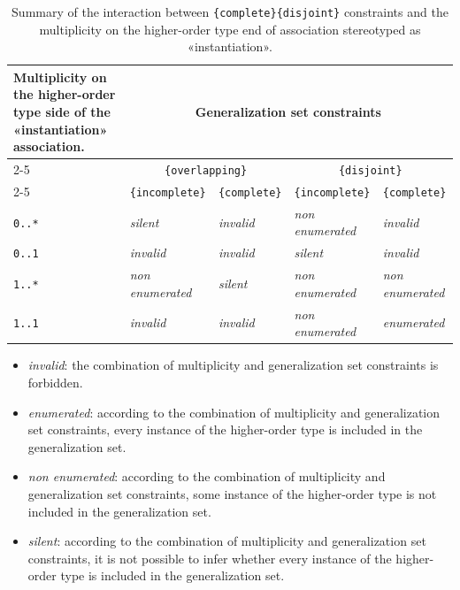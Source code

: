 \begin{table}[hbt]
\caption{Summary of the interaction between \texttt{\{complete\}}\/\texttt{\{disjoint\}} constraints and the multiplicity on the higher-order type end of association stereotyped as «instantiation».}
\label{tab:mlt-generalization-set-contraints}
\begin{tabularx}{\linewidth}{|X|l|l|l|l|}
\hline
\multirow{3}{*}{%
  \parbox{\linewidth}{%
    \textbf{Multiplicity on the higher-order type side of the «instantiation» association.}%
  }%
}
& \multicolumn{4}{c|}{\textbf{Generalization set constraints}} \\ \cline{2-5}
& \multicolumn{2}{c|}{\texttt{\{overlapping\}}}
& \multicolumn{2}{c|}{\texttt{\{disjoint\}}} \\ \cline{2-5}
& \texttt{\{incomplete\}}
& \texttt{\{complete\}}
& \texttt{\{incomplete\}}
& \texttt{\{complete\}} \\ \hline
\texttt{0..*} & 
    \textit{silent} &
    \textit{invalid} &
    \textit{non enumerated} &
    \textit{invalid} \\
    \hline
\texttt{0..1} & 
    \textit{invalid} &
    \textit{invalid} &
    \textit{silent} &
    \textit{invalid} \\
    \hline
\texttt{1..*} & 
    \textit{non enumerated} &
    \textit{silent} &
    \textit{non enumerated} &
    \textit{non enumerated} \\
    \hline
\texttt{1..1} & 
    \textit{invalid} &
    \textit{invalid} &
    \textit{non enumerated} &
    \textit{enumerated} \\
    \hline
\end{tabularx}
\end{table}

\begin{itemize}
    \item \textit{invalid}: the combination of multiplicity and generalization set constraints is forbidden.
    \item \textit{enumerated}: according to the combination of multiplicity and generalization set constraints, every instance of the higher-order type is included in the generalization set.
    \item \textit{non enumerated}: according to the combination of multiplicity and generalization set constraints, some instance of the higher-order type is not included in the generalization set.
    \item \textit{silent}: according to the combination of multiplicity and generalization set constraints, it is not possible to infer whether every instance of the higher-order type is included in the generalization set.
\end{itemize}

